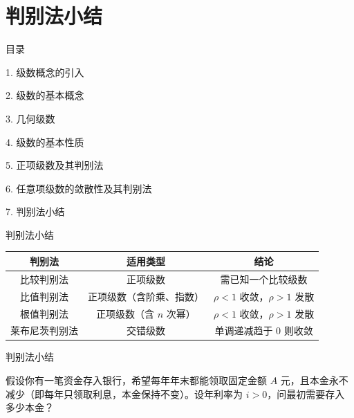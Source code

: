 \documentclass[aspectratio=169,10pt,fontset=fandol]{ctexbeamer}
\begin{document}
\section{判别法小结}
\begin{frame}[t,fragile]{目录}
\normalsize
{\color{black}\normalsize 1. 级数概念的引入\par}\vspace{0.3em}
{\color{black}\normalsize 2. 级数的基本概念\par}\vspace{0.3em}
{\color{black}\normalsize 3. 几何级数\par}\vspace{0.3em}
{\color{black}\normalsize 4. 级数的基本性质\par}\vspace{0.3em}
{\color{black}\normalsize 5. 正项级数及其判别法\par}\vspace{0.3em}
{\color{black}\normalsize 6. 任意项级数的敛散性及其判别法\par}\vspace{0.3em}
{\color{blue}\normalsize 7. 判别法小结\par}\vspace{0.3em}
\end{frame}
\begin{frame}[t,fragile]{判别法小结}
\footnotesize
{\footnotesize
\begin{tabular}{|c|c|c|}
\hline
\textbf{判别法} & \textbf{适用类型} & \textbf{结论} \\
\hline
比较判别法 & 正项级数 & 需已知一个比较级数 \\
\hline
比值判别法 & 正项级数（含阶乘、指数） & \(\rho < 1\) 收敛，\(\rho > 1\) 发散 \\
\hline
根值判别法 & 正项级数（含 \(n\) 次幂） & \(\rho < 1\) 收敛，\(\rho > 1\) 发散 \\
\hline
莱布尼茨判别法 & 交错级数 & 单调递减趋于 0 则收敛 \\
\hline
\end{tabular}
}
\end{frame}
\begin{frame}[t,fragile]{判别法小结}
\footnotesize
{\footnotesize
\begin{application}

假设你有一笔资金存入银行，希望每年年末都能领取固定金额 \(A\) 元，且本金永不减少（即每年只领取利息，本金保持不变）。设年利率为 \(i>0\)，问最初需要存入多少本金？


\end{application}
}
\end{frame}
\end{document}
